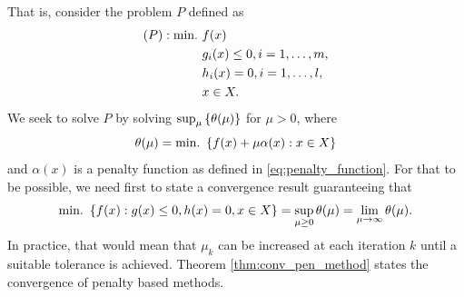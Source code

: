 That is, consider the problem $P$ defined as 
%
\begin{align*}
(P) : \mathop{\text{min.~}} 	   &f(x) \\
				   &g_i(x) \leq 0,  i = 1,\dots,m, \\
                   &h_i(x) = 0,  i = 1,\dots,l, \\
                   &x \in X.
\end{align*}
%
We seek to solve $P$ by solving $\sup_\mu \left\{ \theta(\mu) \right \}$ for $\mu > 0$, where
$$ 
\theta(\mu) = \mathop{\text{min.~}} \left\{ f(x) + \mu\alpha(x) : x \in X \right \} 
$$
and $\alpha(x)$ is a penalty function as defined in \eqref{eq:penalty_function}. For that to be possible, we need first to state a convergence result guaranteeing that 
$$ 
\mathop{\text{min.~}}\left\{ f(x) : g(x) \leq 0, h(x) = 0, x \in X \right \} = \sup_{\mu \geq 0} \theta(\mu) = \lim_{\mu \rightarrow\infty}\theta(\mu).
$$
In practice, that would mean that $\mu_k$ can be increased at each iteration $k$ until a suitable tolerance is achieved. Theorem \ref{thm:conv_pen_method} states the convergence of penalty based methods.

